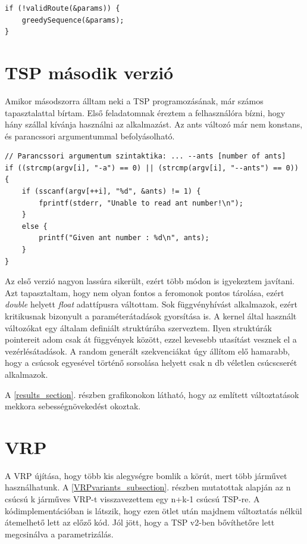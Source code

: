 \begin{lstlisting}[style=CStyle,showstringspaces=false]
if (!validRoute(&params)) {
	greedySequence(&params);
}
\end{lstlisting}

\section{TSP második verzió}
Amikor másodszorra álltam neki a TSP programozásának, már számos tapasztalattal bírtam. Első feladatomnak éreztem a felhasználóra bízni, hogy hány szállal kívánja használni az alkalmazást. Az ants változó már nem konstans, és parancssori argumentummal befolyásolható.

\begin{lstlisting}[style=CStyle,showstringspaces=false]
// Parancssori argumentum szintaktika: ... --ants [number of ants]
if ((strcmp(argv[i], "-a") == 0) || (strcmp(argv[i], "--ants") == 0))
{
	if (sscanf(argv[++i], "%d", &ants) != 1) {
		fprintf(stderr, "Unable to read ant number!\n");
	}
	else {
		printf("Given ant number : %d\n", ants);
	}
}
\end{lstlisting}

 Az első verzió nagyon lassúra sikerült, ezért több módon is igyekeztem javítani. Azt tapasztaltam, hogy nem olyan fontos a feromonok pontos tárolása, ezért \textit{double} helyett \textit{float} adattípusra váltottam. 
 Sok függvényhívást alkalmazok, ezért kritikusnak bizonyult a paraméterátadások gyorsítása is. A kernel által használt változókat egy általam definiált struktúrába szerveztem. Ilyen struktúrák pointereit adom csak át függvények között, ezzel kevesebb utasítást vesznek el a vezérlésátadások. A random generált szekvenciákat úgy állítom elő hamarabb, hogy a csúcsok egyesével történő sorsolása helyett csak n db véletlen csúcscserét alkalmazok. 
 
 A \ref{results_section}. részben grafikonokon látható, hogy az említett változtatások mekkora sebességnövekedést okoztak.

\section{VRP}

A VRP újítása, hogy több kis alegységre bomlik a körút, mert több járművet használhatunk. A \ref{VRPvariants_subsection}. részben mutatottak alapján az n csúcsú k járműves VRP-t visszavezettem egy n+k-1 csúcsú TSP-re. A kódimplementációban is látszik, hogy ezen ötlet után majdnem változtatás nélkül átemelhető lett az előző kód. Jól jött, hogy a TSP v2-ben bővíthetőre lett megcsinálva a parametrizálás.

